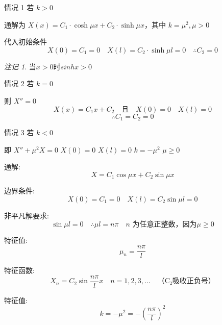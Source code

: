 \documentclass[a4paper, 12pt, oneside]{article} %
\numberwithin{subsection}{section}
\numberwithin{subsubsection}{subsection}
\theoremstyle{plain}
\theoremstyle{definition}
\theoremstyle{remark}
\newtheorem{remark}[theorem]{注记}
\begin{document}
		情况 1 \quad 若 \(k > 0\)
		
		通解为 \(X(x) = C_1 \cdot \cosh \mu x + C_2 \cdot \sinh \mu x\)，其中 \(k = \mu^2,\mu>0\)
		
		代入初始条件 
		\begin{equation}
			X(0) = C_1 = 0 \quad X(l) = C_2 \cdot \sinh \mu l = 0 \quad \therefore C_2 = 0
		\end{equation}
		\begin{remark}
			当$x>0$时$sinhx>0$
		\end{remark}
		
		
		情况 2 \quad 若 \(k = 0\)
		
		则 \(X'' = 0\)
		\begin{equation}
			X(x) = C_1 x + C_2 \quad \text{且} \quad X(0) = 0 \quad X(l) = 0
		\end{equation}
		\begin{equation}
			\therefore C_1 = C_2 = 0
		\end{equation}
		
		情况 3 \quad 若 \(k < 0\)
		
		即 \(X'' + \mu^2 X = 0\) \quad \(X(0) = 0\) \quad \(X(l) = 0\) \quad \(k = -\mu^2\)  \quad \(\mu \geq 0\)
		
		通解:
		\begin{equation}
			X = C_1 \cos \mu x + C_2 \sin \mu x
		\end{equation}
		
		
		
		边界条件:
		\begin{equation}
			X(0) = C_1 = 0 \quad X(l) = C_2 \sin \mu l = 0
		\end{equation}
		
		非平凡解要求:
		\begin{equation*}
			\sin \mu l = 0 \quad \therefore \mu l = n\pi \quad n \text{ 为任意正整数，因为$\mu \geq 0$}
		\end{equation*}
		
		特征值:
		\begin{equation}
			\mu_n = \frac{n\pi}{l}
		\end{equation}
		
		特征函数:
		\begin{equation}
			X_n = C_2 \sin \frac{n\pi}{l} x \quad n = 1, 2, 3, \ldots \quad \text{（C₂吸收正负号）}
		\end{equation}
		
		特征值:
		\begin{equation}
			k = -\mu^2 = -\left(\frac{n\pi}{l}\right)^2
		\end{equation}
		
\end{document}
